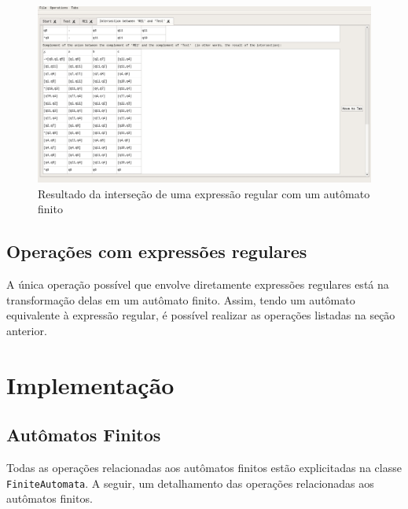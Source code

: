 \documentclass{article}
\begin{document}
        \begin{figure}[htp]
            \centering
            \includegraphics[width=.7\linewidth]{print_intersection.jpg}
            \caption{Resultado da interseção de uma expressão regular com um
            autômato finito}
            \label{fig:intersec}
        \end{figure}

    \subsection{Operações com expressões regulares}
        A única operação possível que envolve diretamente expressões regulares
        está na transformação delas em um autômato finito. Assim, tendo um
        autômato equivalente à expressão regular, é possível realizar as
        operações listadas na seção anterior.

\section{Implementação}
\label{sec:imp}
    \subsection{Autômatos Finitos}
        Todas as operações relacionadas aos autômatos finitos estão
        explicitadas na classe \texttt{FiniteAutomata}. A seguir, um
        detalhamento das operações relacionadas aos autômatos finitos.
\end{document}
